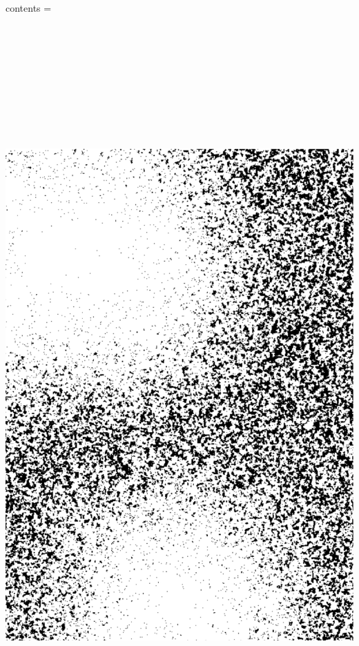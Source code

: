 \documentclass[a4paper,12pt]{report}
\begin{document}
{  contents = {\includegraphics[width=297mm, height=297mm]{figure_code/chapter_2_background_pdfa}}}
\BgThispage
\begin{refsection}



\printbibliography[heading=subbibintoc]
\end{refsection}
\end{document}
